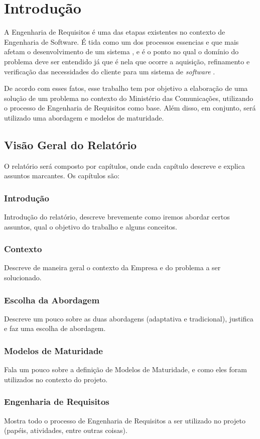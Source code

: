 \chapter[Introdução]{Introdução}

A Engenharia de Requisitos é uma das etapas existentes no contexto de Engenharia de Software. É tida como um dos processos essencias e que mais  afetam o desenvolvimento de um sistema \cite{hofmann001}, e é o ponto no qual o domínio do problema deve ser entendido já que é nela que ocorre a aquisição, refinamento e verificação das necessidades do cliente para um sistema de \emph{software} \cite{ieee001}.

De acordo com esses fatos, esse trabalho tem por objetivo a elaboração de uma solução de um problema no contexto do Ministério das Comunicações, utilizando o processo de Engenharia de Requisitos como base. Além disso, em conjunto, será utilizado uma abordagem e modelos de maturidade.

\section{Visão Geral do Relatório}
O relatório será composto por capítulos, onde cada capítulo descreve e explica assuntos marcantes. Os capítulos são:

\subsection{Introdução}
Introdução do relatório, descreve brevemente como iremos abordar certos assuntos, qual o objetivo do trabalho e alguns conceitos.
\subsection{Contexto}
Descreve de maneira geral o contexto da Empresa e do problema a ser solucionado.
\subsection{Escolha da Abordagem}
Descreve um pouco sobre as duas abordagens (adaptativa e tradicional), justifica e faz uma escolha de abordagem.
\subsection{Modelos de Maturidade}
Fala um pouco sobre a definição de Modelos de Maturidade, e como eles foram utilizados no contexto do projeto.
\subsection{Engenharia de Requisitos}
Mostra todo o processo de Engenharia de Requisitos a ser utilizado no projeto (papéis, atividades, entre outras coisas).

